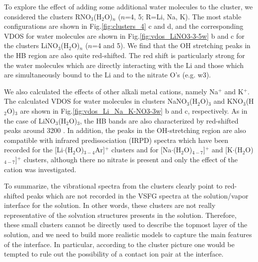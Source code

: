 To explore the effect of adding some additional water molecules to
the cluster, we considered the clusters RNO$_3$(H$_2$O)$_n$ ($n$=4, 5; R=Li, Na, K).
The most stable configurations are shown in Fig.\thinspace\ref{fig:clusters_4} c and d,
and the corresponding VDOS for water molecules are shown in
Fig.\thinspace\ref{fig:vdos_LiNO3-3-5w} b and c for the clusters LiNO$_3$(H$_2$O)$_n$
($n$=4 and 5). We find that the OH stretching peaks in the HB region are also quite red-shifted.
The red shift is particularly strong for the water molecules which are directly interacting with
the Li and those which are simultaneously bound to the Li and to the nitrate O's (e.g. w3).

%

We also calculated the effects of other alkali metal cations, namely Na$^+$ and K$^+$. 
The calculated VDOS for water molecules in clusters NaNO$_3$(H$_2$O)$_3$ and KNO$_3$(H$_2$O)$_3$ are shown in 
Fig.\thinspace\ref{fig:vdos_Li_Na_K-NO3-3w} b and c, respectively. As in the case of LiNO$_3$(H$_2$O)$_3$, the HB 
bands are also characterized by red-shifted peaks around 3200 \centimeter.
In addition, the peaks in the OH-stretching region are also compatible with infrared predissociation
(IRPD) spectra which have been recorded for the [Li$\cdot$(H$_2$O)$_{3-4}$Ar]$^+$
clusters \cite{rodriguez2011, Miller2008, Miller2008b}
and for [Na$\cdot$(H$_2$O)$_{4-7}$]$^+$ and [K$\cdot$(H$_2$O)$_{4-7}$]$^+$ clusters\cite{beck2011}, although there no
nitrate is present and only the effect of the cation was investigated.

To summarize, the vibrational spectra from the clusters clearly point to red-shifted peaks which are not 
recorded in the VSFG spectra at the solution/vapor interface for the \LiN solution. 
In other words, these clusters are not really representative of the solvation structures presents in the \LiN solution.
Therefore, these small clusters cannot be directly used to describe the topmost layer of the \LiN solution, 
and we need to build more realistic models to capture the main features of the interface. 
In particular, according to the cluster picture one would be tempted to rule out the possibility of a contact 
ion pair at the interface.

